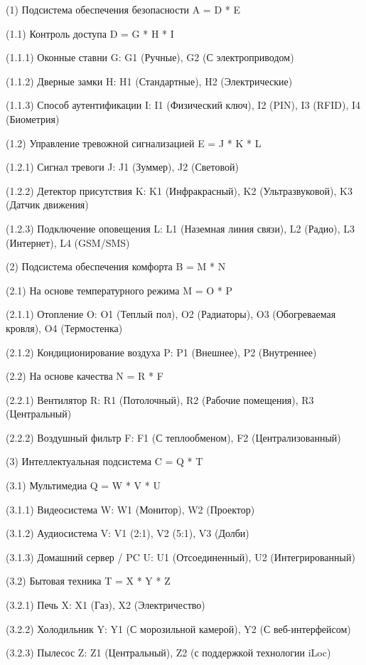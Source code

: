 (1) Подсистема обеспечения безопасности A = D * E

(1.1) Контроль доступа D = G * H * I

(1.1.1) Оконные ставни G: G1 (Ручные), G2 (С электроприводом)

(1.1.2) Дверные замки H: H1 (Стандартные), H2 (Электрические)

(1.1.3) Способ аутентификации I: I1 (Физический ключ), I2 (PIN), I3 (RFID), I4 (Биометрия)

(1.2) Управление тревожной сигнализацией E = J * K * L

(1.2.1) Сигнал тревоги J: J1 (Зуммер), J2 (Световой)

(1.2.2) Детектор присутствия K: K1 (Инфракрасный), K2 (Ультразвуковой), K3 (Датчик движения)

(1.2.3) Подключение оповещения L: L1 (Наземная линия связи), L2 (Радио), L3 (Интернет), L4 (GSM/SMS)

(2) Подсистема обеспечения комфорта B = M * N

(2.1) На основе температурного режима M = O * P

(2.1.1) Отопление O: O1 (Теплый пол), O2 (Радиаторы), O3 (Обогреваемая кровля), O4 (Термостенка)

(2.1.2) Кондиционирование воздуха P: P1 (Внешнее), P2 (Внутреннее)

(2.2) На основе качества N = R * F

(2.2.1) Вентилятор R: R1 (Потолочный), R2 (Рабочие помещения), R3 (Центральный)

(2.2.2) Воздушный фильтр F: F1 (С теплообменом), F2 (Централизованный)

(3) Интеллектуальная подсистема C = Q * T

(3.1) Мультимедиа Q = W * V * U

(3.1.1) Видеосистема W: W1 (Монитор), W2 (Проектор)

(3.1.2) Аудиосистема V: V1 (2:1), V2 (5:1), V3 (Долби)

(3.1.3) Домашний сервер / PC U: U1 (Отсоединенный), U2 (Интегрированный)

(3.2) Бытовая техника T = X * Y * Z

(3.2.1) Печь X: X1 (Газ), X2 (Электричество)

(3.2.2) Холодильник Y: Y1 (С морозильной камерой), Y2 (С веб-интерфейсом)

(3.2.3) Пылесос Z: Z1 (Центральный), Z2 (с поддержкой технологии iLoc)



